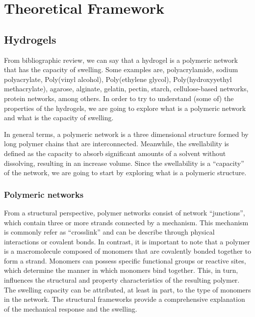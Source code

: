 \chapter{Theoretical Framework}\label{ch2:TheoFrame}

\section{Hydrogels}


From bibliographic review, we can say that a hydrogel is a polymeric network that has the capacity of swelling\citep{choiSynthesisHydrogelBasedMicrogels2025,dayTunableNetworkArchitecture2025,ahmedHydrogelPreparationCharacterization2015a,bustamante-torresHydrogelsClassificationAccording2021}.
Some examples are,
    polyacrylamide,
    sodium polyacrylate,
    Poly(vinyl alcohol),
    Poly(ethylene glycol),
    Poly(hydroxyyethyl methacrylate),
    agarose,
    alginate,
    gelatin,
    pectin,
    starch,
    cellulose-based networks,
    protein networks,
    among others.
In order to try to understand (some of) the properties of the hydrogels, we are going to explore what is a polymeric network and what is the capacity of swelling.

In general terms, a polymeric network is a three dimensional structure formed by long polymer chains that are interconnected.
Meanwhile, the swellability is defined as the capacity to absorb significant amounts of a solvent without dissolving, resulting in an increase volume.
Since the swellability is a ``capacity'' of the network, we are going to start by exploring what is a polymeric structure\citep{bustamante-torresHydrogelsClassificationAccording2021}.

\subsection{Polymeric networks}

From a structural perspective, polymer networks consist of network ``junctions'', which contain three or more strands connected by a mechanism. 
This mechanism is commonly refer as ``crosslink'' and can be describe through physical interactions or covalent bonds.
In contrast, it is important to note that a polymer is a macromolecule composed of monomers that are covalently bonded together to form a strand.
Monomers can possess specific functional groups or reactive sites, which determine the manner in which monomers bind together. 
This, in turn, influences the structural and property characteristics of the resulting polymer.
The swelling capacity can be attributed, at least in part, to the type of monomers in the network. 
The structural frameworks provide a comprehensive explanation of the mechanical response and the swelling.

